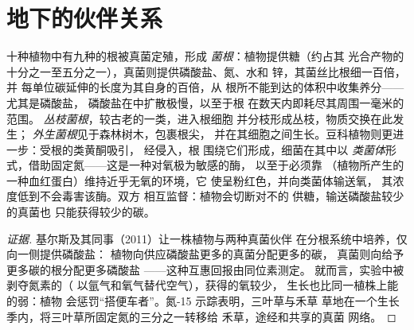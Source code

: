 \section{地下的伙伴关系}

\begin{proposition}[菌根与根瘤菌]\label{prop:b2:living-soil:symbiosis}
十种植物中有九种的根被真菌定殖，形成
\emph{菌根}：植物提供糖（约占其
光合产物的十分之一至五分之一），真菌则提供磷酸盐、氮、水和
锌，其菌丝比根细一百倍，并
每单位碳延伸的长度为其自身的百倍，从
根所不能到达的体积中收集养分——尤其是磷酸盐，
磷酸盐在中扩散极慢，以至于根
在数天内即耗尽其周围一毫米的范围。
\emph{丛枝菌根}，较古老的一类，进入根细胞
并分枝形成丛枝，物质交换在此发生；
\emph{外生菌根}见于森林树木，包裹根尖，
并在其细胞之间生长。豆科植物则更进一步：受根的类黄酮吸引，
经侵入，根
围绕它们形成\emph{}，细菌在其中以
\emph{类菌体}形式，借助固定氮——这是一种对氧极为敏感的酶，
以至于必须靠
\emph{}（植物所产生的一种血红蛋白）维持近乎无氧的环境，它
使呈粉红色，并向类菌体输送氧，
其浓度低到不会毒害该酶。双方
相互监督：植物会切断对不的
供糖，输送磷酸盐较少的真菌也
只能获得较少的碳。
\end{proposition}
\begin{proof}[证据]
基尔斯及其同事（2011）让一株植物与两种真菌伙伴
在分根系统中培养，仅向一侧提供磷酸盐：
植物向供应磷酸盐更多的真菌分配更多的碳，
真菌则向给予更多碳的根分配更多磷酸盐
——这种互惠回报由同位素测定。
就而言，实验中被剥夺氮素的（
以氩气和氧气替代空气），获得的氧较少，
生长也比同一植株上能的弱：植物
会惩罚“搭便车者”。氮-15 示踪表明，三叶草与禾草
草地在一个生长季内，将三叶草所固定氮的三分之一转移给
禾草，途经和共享的真菌
网络。
\end{proof}

